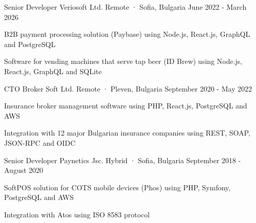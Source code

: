 

\begin{cventries}

  \cventry
    {Senior Developer} %
    {Veriosoft Ltd.} %
    {Remote · Sofia, Bulgaria} %
    {June 2022 - March 2026} %
    {
      \begin{cvitems} %
        \item {B2B payment processing solution (Paybase) using Node.js, React.js, GraphQL and PostgreSQL}
        \item {Software for vending machines that serve tap beer (ID Brew) using Node.js, React.js, GraphQL and SQLite}
      \end{cvitems}
    }

  \cventry
    {CTO} %
    {Broker Soft Ltd.} %
    {Remote · Pleven, Bulgaria} %
    {September 2020 - May 2022} %
    {
      \begin{cvitems} %
        \item {Insurance broker management software using PHP, React.js, PostgreSQL and AWS}
        \item {Integration with 12 major Bulgarian insurance companies using REST, SOAP, JSON-RPC and OIDC}
      \end{cvitems}
    }

  \cventry
    {Senior Developer} %
    {Paynetics Jsc.} %
    {Hybrid · Sofia, Bulgaria} %
    {September 2018 - August 2020} %
    {
      \begin{cvitems} %
        \item {SoftPOS solution for COTS mobile devices (Phos) using PHP, Symfony, PostgreSQL and AWS}
        \item {Integration with Atos using ISO 8583 protocol}
      \end{cvitems}
    }


\end{cventries}
